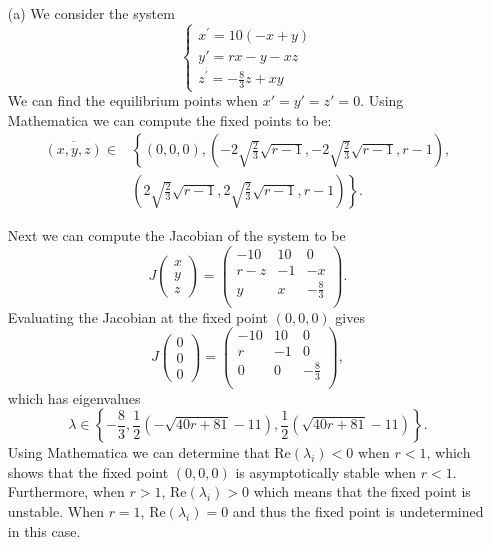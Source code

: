 \documentclass[12pt]{report}
\begin{document}
\begin{solution}

    \noindent
    \begin{enumerate}
        \item [(a)]
        We consider the system
        \begin{equation*}
        \left\{\begin{array}{l}
        x^{\prime}=10(-x+y) \\
        y'=r x-y-x z \\
        z^{\prime}=-\frac{8}{3} z+x y
        \end{array}\right.
        \end{equation*}
        We can find the equilibrium points when $x' = y' = z' = 0$. Using Mathematica we can compute the fixed points to be:
        \begin{align*}
            \overline{(x,y,z)} \in & \left\{ (0,0,0), \left(-2 \sqrt{\frac{2}{3}} \sqrt{r-1},-2 \sqrt{\frac{2}{3}} \sqrt{r-1},r-1\right), \right. \\ & \left. \left(2 \sqrt{\frac{2}{3}} \sqrt{r-1}, 2 \sqrt{\frac{2}{3}} \sqrt{r-1}, r-1\right) \right\}.
        \end{align*}
        
        Next we can compute the Jacobian of the system to be
        \[ 
            J\begin{pmatrix}
                x\\y\\z
            \end{pmatrix} = \left(
                \begin{array}{ccc}
                 -10 & 10 & 0 \\
                 r-z & -1 & -x \\
                 y & x & -\frac{8}{3} \\
                \end{array}
                \right).
        \]
        Evaluating the Jacobian at the fixed point $(0,0,0)$ gives
        \[ 
            J\begin{pmatrix}
                0\\0\\0
            \end{pmatrix} = \left(
\begin{array}{ccc}
 -10 & 10 & 0 \\
 r & -1 & 0 \\
 0 & 0 & -\frac{8}{3} \\
\end{array}
\right),
        \]
        which has eigenvalues
        \[ 
            \lambda \in \left\{-\frac{8}{3},\frac{1}{2} \left(-\sqrt{40 r+81}-11\right),\frac{1}{2} \left(\sqrt{40 r+81}-11\right)\right\}.
        \]
        Using Mathematica we can determine that $\text{Re}(\lambda_i)<0$ when $r < 1$, which shows that the fixed point $(0,0,0)$ is asymptotically stable when $r<1$. Furthermore, when $r>1$, $\text{Re}(\lambda_i)>0$ which means that the fixed point is unstable. When $r=1$, $\text{Re}(\lambda_i)=0$ and thus the fixed point is undetermined in this case.


\end{enumerate}
\end{solution}
\end{document}
